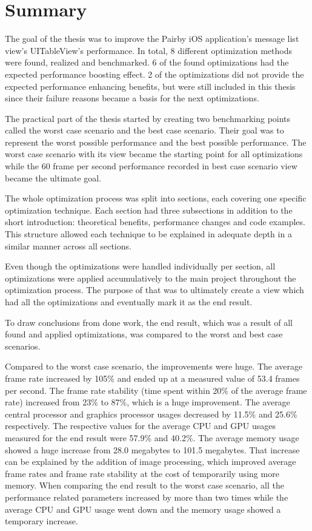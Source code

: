 \documentclass[a4paper,12pt]{article}
\begin{document}
\newpage
\section{Summary}
The goal of the thesis was to improve the Pairby iOS application's message list view's UITableView's performance. In total, 8 different optimization methods were found, realized and benchmarked. 6 of the found optimizations had the expected performance boosting effect. 2 of the optimizations did not provide the expected performance enhancing benefits, but were still included in this thesis since their failure reasons became a basis for the next optimizations.

The practical part of the thesis started by creating two benchmarking points called the worst case scenario and the best case scenario. Their goal was to represent the worst possible performance and the best possible performance. The worst case scenario with its  view became the starting point for all optimizations while the 60 frame per second performance recorded in best case scenario view became the ultimate goal.

The whole optimization process was split into sections, each covering one specific optimization technique. Each section had three subsections in addition to the short introduction: theoretical benefits, performance changes and code examples. This structure allowed each technique to be explained in adequate depth in a similar manner across all sections.

Even though the optimizations were handled individually per section, all optimizations were applied accumulatively to the main project throughout the optimization process. The purpose of that was to ultimately create a view which had all the optimizations and eventually mark it as the end result.

To draw conclusions from done work, the end result, which was a result of all found and applied optimizations, was compared to the worst and best case scenarios.

Compared to the worst case scenario, the improvements were huge. The average frame rate increased by 105\% and ended up at a measured value of 53.4 frames per second. The frame rate stability (time spent within 20\% of the average frame rate) increased from 23\% to 87\%, which is a huge improvement. The average central processor and graphics processor usages decreased by 11.5\% and 25.6\% respectively. The respective values for the average CPU and GPU usages measured for the end result were 57.9\% and 40.2\%. The average memory usage showed a huge increase from 28.0 megabytes to 101.5 megabytes. That increase can be explained by the addition of image processing, which improved average frame rates and frame rate stability at the cost of temporarily using more memory. When comparing the end result to the worst case scenario, all the performance related parameters increased by more than two times while the average CPU and GPU usage went down and the memory usage showed a temporary increase.
\end{document}
